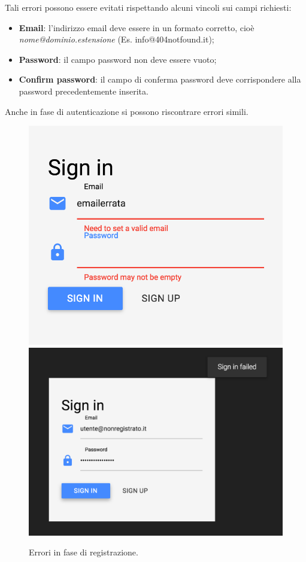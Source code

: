 Tali errori possono essere evitati rispettando alcuni vincoli sui campi richiesti:
\begin{itemize}
\item \textbf{Email}: l'indirizzo email deve essere in un formato corretto, cioè \emph{nome@dominio.estensione} (Es. info@404notfound.it);
\item \textbf{Password}: il campo password non deve essere vuoto;
\item \textbf{Confirm password}: il campo di conferma password deve corrispondere alla password precedentemente inserita.
\end{itemize}
\newpage
Anche in fase di autenticazione si possono riscontrare errori simili.\\

\begin{figure}[!h]
\begin{center}
\includegraphics[scale=0.4]{img/signin_error.png}%
\qquad\qquad
\includegraphics[scale=0.3]{img/signin_error2.png}
\caption{Errori in fase di registrazione.}
\end{center}
\end{figure}

